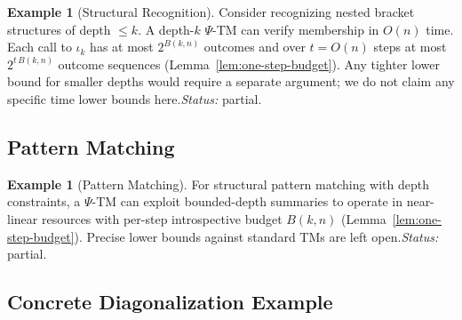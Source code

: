 \documentclass[11pt]{article}
\theoremstyle{plain}
\theoremstyle{definition}
\newtheorem{example}[theorem]{Example}
\newcommand{\PSi}{\Psi}
\begin{document}
\begin{example}[Structural Recognition]
Consider recognizing nested bracket structures of depth $\leq k$. A depth-$k$ $\PSi$-TM can verify membership in $O(n)$ time. Each call to $\iota_k$ has at most $2^{B(k,n)}$ outcomes and over $t=O(n)$ steps at most $2^{t\,B(k,n)}$ outcome sequences (Lemma~\ref{lem:one-step-budget}). Any tighter lower bound for smaller depths would require a separate argument; we do not claim any specific time lower bounds here.\;\emph{Status:} partial.
\end{example}

\subsection{Pattern Matching}

\begin{example}[Pattern Matching]
For structural pattern matching with depth constraints, a $\PSi$-TM can exploit bounded-depth summaries to operate in near-linear resources with per-step introspective budget $B(k,n)$ (Lemma~\ref{lem:one-step-budget}). Precise lower bounds against standard TMs are left open.\;\emph{Status:} partial.
\end{example}

\subsection{Concrete Diagonalization Example}
\end{document}

